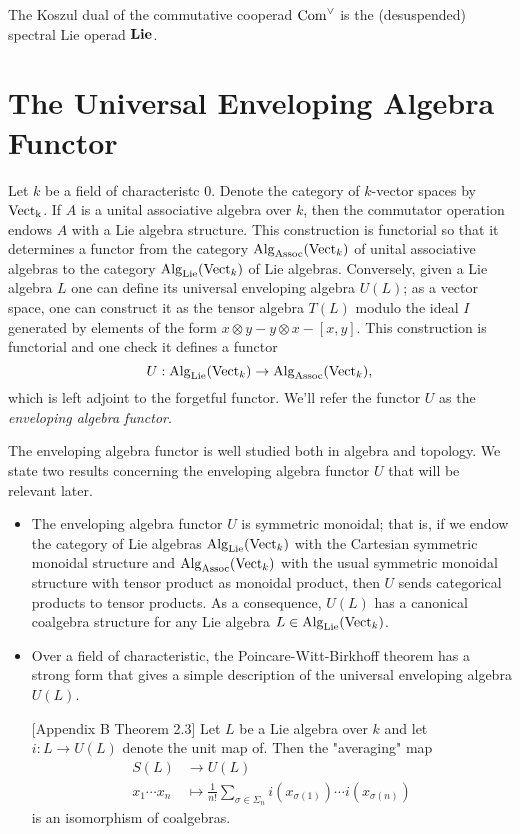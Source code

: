 \begin{theorem}
\label{Koszul dual of commutative cooperad}
	The Koszul dual of the commutative cooperad $\operatorname{Com}^{\vee}$ is the (desuspended) spectral Lie operad $\mathbf{Lie}$.
\end{theorem}


\section{The Universal Enveloping Algebra Functor}
Let $k$ be a field of characteristc $0$. Denote the category of $k$-vector spaces by $\operatorname{Vect_k}$.
If $A$ is a unital associative algebra over $k$, then the commutator operation endows $A$ with a Lie algebra structure. This construction is functorial so that it determines a functor from the category $\operatorname{Alg}_{\operatorname{Assoc}}(\operatorname{Vect}_k)$ of unital associative algebras to the category $\operatorname{Alg}_{\operatorname{Lie}}(\operatorname{Vect}_k)$ of Lie algebras. 
Conversely, given a Lie algebra $L$ one can define its universal enveloping algebra $U(L)$; as a vector space, one can construct it as the tensor algebra $T(L)$ modulo the ideal $I$ generated by 
 elements of the form $x\otimes y - y\otimes x-[x,y]$. 
This construction is functorial and one check it defines a functor
$$
U:\operatorname{Alg}_{\operatorname{Lie}}(\operatorname{Vect}_k) \rightarrow \operatorname{Alg}_{\operatorname{Assoc}}(\operatorname{Vect}_k),
$$
which is left adjoint to the forgetful functor.
We'll refer the functor $U$ as the \emph{enveloping algebra functor}. 

The enveloping algebra functor is well studied both in algebra and topology. We state two results concerning the enveloping algebra functor $U$ that will be relevant later.
\begin{itemize}
	\item The enveloping algebra functor $U$ is symmetric monoidal; that is, if we endow the category of Lie algebras $\operatorname{Alg}_{\operatorname{Lie}}(\operatorname{Vect}_k)$ with the Cartesian symmetric monoidal structure and $\operatorname{Alg}_{\operatorname{Assoc}}(\operatorname{Vect}_k)$ with the usual symmetric monoidal structure with tensor product as monoidal product, then $U$ sends categorical products to tensor products. As a consequence, $U(L)$ has a canonical coalgebra structure for any Lie algebra $L\in \operatorname{Alg}_{\operatorname{Lie}}(\operatorname{Vect}_k)$.
	\item Over a field of characteristic, the Poincare-Witt-Birkhoff theorem has a strong form that gives a simple description of the universal enveloping algebra $U(L)$. 
	\begin{theorem}
		\cite{Quillen_RHT}[Appendix B Theorem 2.3]
		Let $L$ be a Lie algebra over $k$ and let $i:L\to U(L)$ denote the unit map of. Then the "averaging" map
		\begin{align*}
			S(L) & \to U(L) \\
			x_1\cdots x_n & \mapsto \frac{1}{n!}\sum_{\sigma\in \Sigma_n} i(x_{\sigma(1)})\cdots i(x_{\sigma(n)})
		\end{align*}	
		is an isomorphism of coalgebras.
	\end{theorem}
	
\end{itemize}

